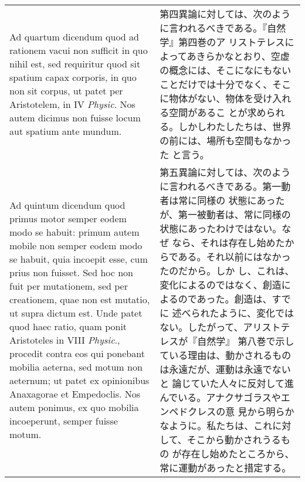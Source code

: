 \documentclass[10pt]{jsarticle} %
\begin{document}
\begin{longtable}{p{21em}p{21em}}
{\sc Ad quartum dicendum} quod ad rationem vacui non sufficit in quo nihil
 est, sed requiritur quod sit spatium capax corporis, in quo non sit
 corpus, ut patet per Aristotelem, in IV {\it Physic}. Nos autem dicimus non
 fuisse locum aut spatium ante mundum.

&

第四異論に対しては、次のように言われるべきである。『自然学』第四巻のア
リストテレスによってあきらかなとおり、空虚の概念には、そこになにもない
ことだけでは十分でなく、そこに物体がない、物体を受け入れる空間があるこ
とが求められる。しかしわたしたちは、世界の前には、場所も空間もなかった
と言う。

\\



Ad quintum dicendum quod primus motor semper eodem modo se habuit: primum
 autem mobile non semper eodem modo se habuit, quia incoepit esse, cum
 prius non fuisset. Sed hoc non fuit per mutationem, sed per creationem,
 quae non est mutatio, ut supra dictum est. Unde patet quod haec ratio,
 quam ponit Aristoteles in VIII {\it Physic}., procedit contra eos qui
 ponebant mobilia aeterna, sed motum non aeternum; ut patet ex
 opinionibus Anaxagorae et Empedoclis. Nos autem ponimus, ex quo mobilia
 incoeperunt, semper fuisse motum.

&

第五異論に対しては、次のように言われるべきである。第一動者は常に同様の
状態にあったが、第一被動者は、常に同様の状態にあったわけではない。なぜ
なら、それは存在し始めたからである。それ以前にはなかったのだから。しか
し、これは、変化によるのではなく、創造によるのであった。創造は、すでに
述べられたように、変化ではない。したがって、アリストテレスが『自然学』
第八巻で示している理由は、動かされるものは永遠だが、運動は永遠でないと
論じていた人々に反対して進んでいる。アナクサゴラスやエンペドクレスの意
見から明らかなように。私たちは、これに対して、そこから動かされうるもの
が存在し始めたところから、常に運動があったと措定する。


\\




\end{longtable}
\end{document}

